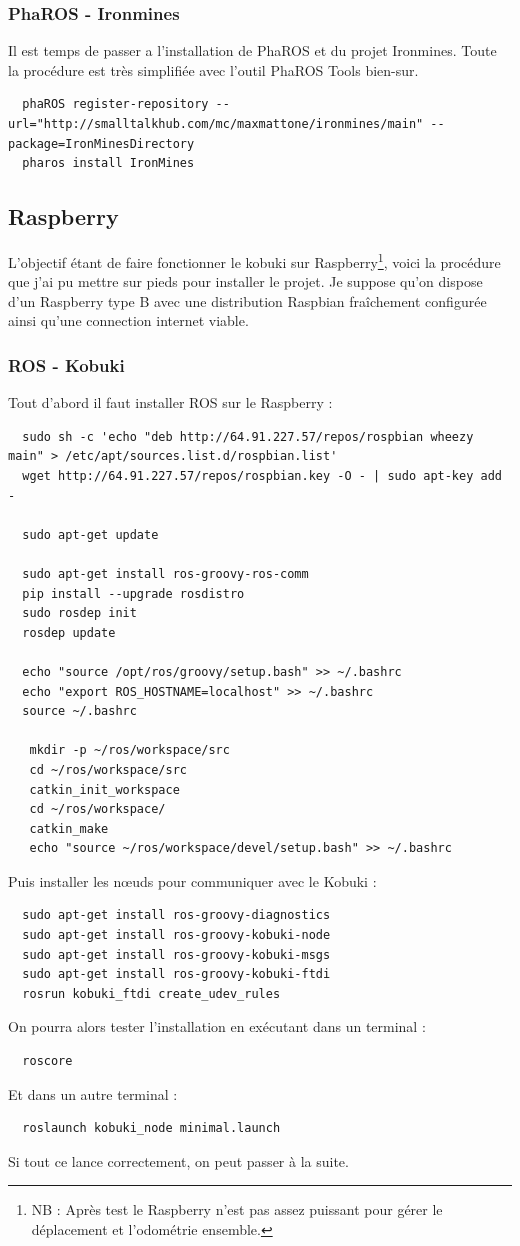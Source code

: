 \documentclass[a4paper, 11pt]{article}
\begin{document}
\subsubsection{PhaROS - Ironmines}
Il est temps de passer a l'installation de PhaROS et du projet
Ironmines. Toute la procédure est très simplifiée avec l'outil PhaROS
Tools bien-sur.

\begin{lstlisting}
  phaROS register-repository --url="http://smalltalkhub.com/mc/maxmattone/ironmines/main" --package=IronMinesDirectory
  pharos install IronMines
\end{lstlisting}

\subsection{Raspberry}

L'objectif étant de faire fonctionner le kobuki sur
Raspberry\footnote{NB : Après test le Raspberry n'est pas assez
  puissant pour gérer le déplacement et l'odométrie ensemble.}, voici
la procédure que j'ai pu mettre sur pieds pour installer le projet. Je
suppose qu'on dispose d'un Raspberry type B avec une distribution
Raspbian fraîchement configurée ainsi qu'une connection internet
viable.

\subsubsection{ROS - Kobuki}
Tout d'abord il faut installer ROS sur le Raspberry : 
\begin{lstlisting}
  sudo sh -c 'echo "deb http://64.91.227.57/repos/rospbian wheezy main" > /etc/apt/sources.list.d/rospbian.list'
  wget http://64.91.227.57/repos/rospbian.key -O - | sudo apt-key add -

  sudo apt-get update

  sudo apt-get install ros-groovy-ros-comm
  pip install --upgrade rosdistro
  sudo rosdep init
  rosdep update

  echo "source /opt/ros/groovy/setup.bash" >> ~/.bashrc
  echo "export ROS_HOSTNAME=localhost" >> ~/.bashrc
  source ~/.bashrc

   mkdir -p ~/ros/workspace/src
   cd ~/ros/workspace/src
   catkin_init_workspace
   cd ~/ros/workspace/
   catkin_make
   echo "source ~/ros/workspace/devel/setup.bash" >> ~/.bashrc
\end{lstlisting}
Puis installer les n{\oe}uds pour communiquer avec le Kobuki : 
\begin{lstlisting}
  sudo apt-get install ros-groovy-diagnostics
  sudo apt-get install ros-groovy-kobuki-node 
  sudo apt-get install ros-groovy-kobuki-msgs
  sudo apt-get install ros-groovy-kobuki-ftdi
  rosrun kobuki_ftdi create_udev_rules
\end{lstlisting}
On pourra alors tester l'installation en exécutant dans un terminal :
\begin{verbatim}
  roscore
\end{verbatim}
Et dans un autre terminal : 
\begin{verbatim}
  roslaunch kobuki_node minimal.launch
\end{verbatim}
Si tout ce lance correctement, on peut passer à la suite.
\end{document}
